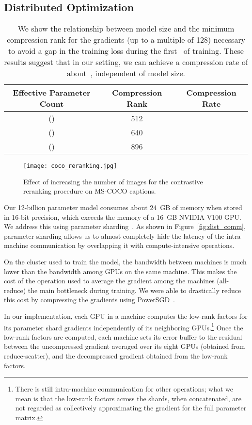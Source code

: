 \documentclass{article}
\begin{document}
\subsection{Distributed Optimization}
\label{sec:dist_opt}
\begin{table}[]
    \centering\scriptsize
    \begin{tabular}{ccc}
        \toprule
         Effective Parameter Count & Compression Rank & Compression Rate \\
         \midrule
          () & 512 &  \\
          () & 640 &  \\
          () & 896 &  \\
         \bottomrule
    \end{tabular}
    \caption{We show the relationship between model size and the minimum compression rank for the gradients (up to a multiple of 128) necessary to avoid a gap in the training loss during the first~ of training. These results suggest that in our setting, we can achieve a compression rate of about~, independent of model size.}
    \label{tab:cmp_rank}
\end{table}
\begin{figure*}[t]
    \centering
    \texttt{[image: coco\_reranking.jpg]}
    \caption{Effect of increasing the number of images for the contrastive reranking procedure on MS-COCO captions.}
    \label{fig:coco_reranking}
\end{figure*}
Our 12-billion parameter model consumes about 24~GB of memory when stored in 16-bit precision, which exceeds the memory of a 16~GB NVIDIA V100 GPU. We address this using parameter sharding~\cite{rajbhandari2019zero}. As shown in Figure~\ref{fig:dist_comm}, parameter sharding allows us to almost completely hide the latency of the intra-machine communication by overlapping it with compute-intensive operations.

On the cluster used to train the model, the bandwidth between machines is much lower than the bandwidth among GPUs on the same machine. This makes the cost of the operation used to average the gradient among the machines (all-reduce) the main bottleneck during training. We were able to drastically reduce this cost by compressing the gradients using PowerSGD~\cite{vogels2019powersgd}.

In our implementation, each GPU in a machine computes the low-rank factors for its parameter shard gradients independently of its neighboring GPUs.\footnote{There is still intra-machine communication for other operations; what we mean is that the low-rank factors across the shards, when concatenated, are not regarded as collectively approximating the gradient for the full parameter matrix.} Once the low-rank factors are computed, each machine sets its error buffer to the residual between the uncompressed gradient averaged over its eight GPUs (obtained from reduce-scatter), and the decompressed gradient obtained from the low-rank factors.
\end{document}
